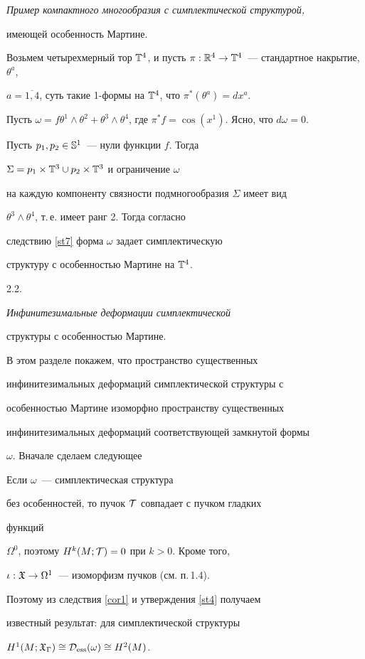 {\it Пример компактного многообразия с симплектической структурой,


имеющей особенность Мартине.}


Возьмем четырехмерный тор $\T^4$, и пусть $\pi :  \R^4 \to


\T^4$~--- стандартное накрытие, $\theta^a$,


$a=\overline{1,4}$, суть такие 1-формы на $\T^4$, что $\pi^*(\theta^a) =


dx^a$.


Пусть  $\omega = f \theta^1 \wedge \theta^2 + \theta^3 \wedge


\theta^4$, где $\pi^* f = \cos(x^1)$. Ясно, что $d\omega=0$.


Пусть $p_1, p_2 \in {\Bbb S}^1$~--- нули функции $f$. Тогда


$\Sigma = p_1 \times {\Bbb T}^3 \cup p_2 \times {\Bbb T}^3$ и ограничение $\omega$


на каждую компоненту связности подмногообразия $\Sigma$ имеет вид


$\theta^3 \wedge \theta^4$, т.\,е. имеет ранг 2. Тогда согласно


следствию  \ref{st7} форма $\omega$ задает симплектическую


структуру с особенностью Мартине на ${\Bbb T}^4$.








2.2. {\it Инфинитезимальные деформации симплектической


структуры с особенностью Мартине.}


В этом разделе  покажем, что пространство существенных


инфинитезимальных деформаций симплектической структуры с


особенностью Мартине изоморфно пространству существенных


инфинитезимальных деформаций соответствующей замкнутой формы


$\omega$. Вначале сделаем следующее





\begin{notenonum}


Если $\omega$~--- симплектическая структура


без особенностей, то пучок ${\cal T}$ совпадает с пучком гладких


функций


$\Omega^0$, поэтому $H^k(M; {\cal T})=0$ при $k>0$. Кроме того,


$\iota : {\frak X} \to \Omega^1$~--- изоморфизм пучков (см. п.\,1.4).


Поэтому из следствия \ref{cor1} и утверждения \ref{st4} получаем


известный результат: для симплектической структуры


$H^1(M; {\frak X}_\Gamma) \cong {\cal D}_{\operatorname{ess}}(\omega) \cong H^2(M)$.


\end{notenonum}





